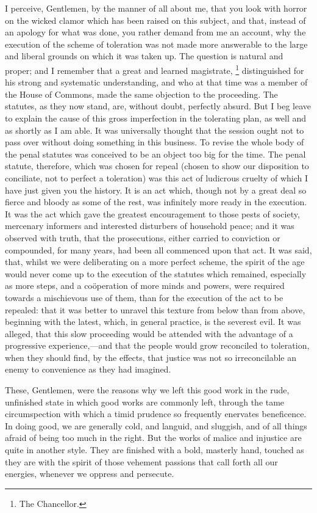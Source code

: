 I perceive, Gentlemen, by the manner of all about me, that you look with horror on the wicked clamor which has been raised on this subject, and that, instead of an apology for what was done, you rather demand from me an account, why the execution of the scheme of toleration was not made more answerable to the large and liberal grounds on which it was taken up. The question is natural and proper; and I remember that a great and learned magistrate,
\footnote{ The Chancellor.}
 distinguished for his strong and systematic understanding, and who at that time was a member of the House of Commons, made the same objection to the proceeding. The statutes, as they now stand, are, without doubt, perfectly absurd. But I beg leave to explain the cause of this gross imperfection in the tolerating plan, as well and as shortly as I am able. It was universally thought that the session ought not to pass over without doing something in this business. To revise the whole body of the penal statutes was conceived to be an object too big for the time. The penal statute, therefore, which was chosen for repeal (chosen to show our disposition to conciliate, not to perfect a toleration) was this act of ludicrous cruelty of which I have just given you the history. It is an act which, though not by a great deal so fierce and bloody as some of the rest, was infinitely more ready in the execution. It was the act which gave the greatest encouragement to those pests of society, mercenary informers and interested disturbers of household peace; and it was observed with truth, that the prosecutions, either carried to conviction or compounded, for many years, had been all commenced upon that act. It was said, that, whilst we were deliberating on a more perfect scheme, the spirit of the age would never come up to the execution of the statutes which remained, especially as more steps, and a coöperation of more minds and powers, were required towards a mischievous use of them, than for the execution of the act to be repealed: that it was better to unravel this texture from below than from above, beginning with the latest, which, in general practice, is the severest evil. It was alleged, that this slow proceeding would be attended with the advantage of a progressive experience,—and that the people would grow reconciled to toleration, when they should find, by the effects, that justice was not so irreconcilable an enemy to convenience as they had imagined.

These, Gentlemen, were the reasons why we left this good work in the rude, unfinished state in which good works are commonly left, through the tame circumspection with which a timid prudence so frequently enervates beneficence. In doing good, we are generally cold, and languid, and sluggish, and of all things afraid of being too much in the right. But the works of malice and injustice are quite in another style. They are finished with a bold, masterly hand, touched as they are with the spirit of those vehement passions that call forth all our energies, whenever we oppress and persecute.

